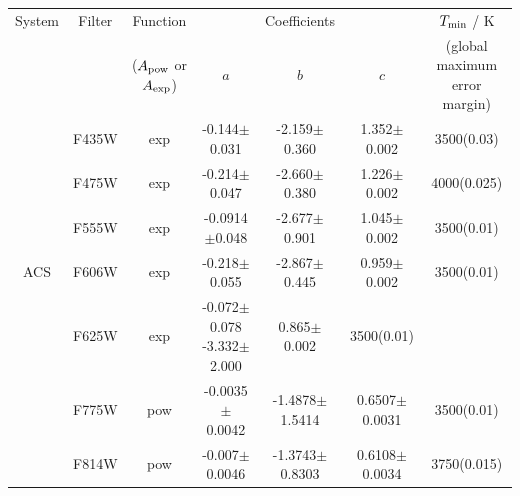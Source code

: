 \documentclass[12pt, a4paper]{report}
\begin{document}
\begin{table}
\begin{center}
\begin{tabular}{ccccccc}
\hline
System & Filter &  Function & & Coefficients & & $T_{\textnormal{min}}$ / K \\
 & & ($A_{\textnormal{pow}}$ or $A_{\textnormal{exp}}$) & $a$ & $b$ & $c$ & (global maximum error margin) \\
\hline
& F435W & exp & -0.144$\pm$0.031 & -2.159$\pm$0.360 & 1.352$\pm$0.002 & 3500(0.03) \\
& F475W & exp & -0.214$\pm$0.047 & -2.660$\pm$0.380 & 1.226$\pm$0.002 & 4000(0.025) \\
& F555W & exp & -0.0914$\pm$0.048 & -2.677$\pm$0.901 & 1.045$\pm$0.002 & 3500(0.01) \\
ACS & F606W & exp & -0.218$\pm$0.055 & -2.867$\pm$0.445 & 0.959$\pm$0.002 & 3500(0.01) \\
& F625W & exp & -0.072$\pm$0.078 -3.332$\pm$2.000 & 0.865$\pm$0.002 & 3500(0.01) \\
& F775W & pow & -0.0035$\pm$0.0042 & -1.4878$\pm$1.5414 & 0.6507$\pm$0.0031 & 3500(0.01) \\
& F814W & pow & -0.007$\pm$0.0046 & -1.3743$\pm$0.8303 & 0.6108$\pm$0.0034 & 3750(0.015) \\ \hline



\end{tabular}
\end{center}
\end{table}
\end{document}
